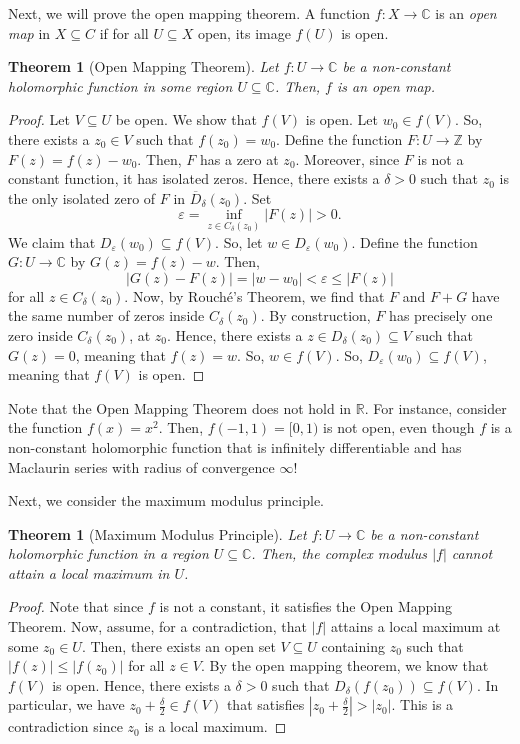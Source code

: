 \documentclass[a4paper, openany]{memoir}
\theoremstyle{definition}
\theoremstyle{plain}
\newtheorem{theorem}[definition]{Theorem}
\begin{document}
    Next, we will prove the open mapping theorem. A function $f \colon X \to \mathbb{C}$ is an \emph{open map} in $X \subseteq C$ if for all $U \subseteq X$ open, its image $f(U)$ is open.
    \begin{theorem}[Open Mapping Theorem]
        Let $f \colon U \to \mathbb{C}$ be a non-constant holomorphic function in some region $U \subseteq \mathbb{C}$. Then, $f$ is an open map.
    \end{theorem}
    \begin{proof}
        Let $V \subseteq U$ be open. We show that $f(V)$ is open. Let $w_0 \in f(V)$. So, there exists a $z_0 \in V$ such that $f(z_0) = w_0$. Define the function $F \colon U \to \mathbb{Z}$ by $F(z) = f(z) - w_0$. Then, $F$ has a zero at $z_0$. Moreover, since $F$ is not a constant function, it has isolated zeros. Hence, there exists a $\delta > 0$ such that $z_0$ is the only isolated zero of $F$ in $\overline{D}_\delta(z_0)$. Set
        \[\varepsilon = \inf_{z \in C_\delta(z_0)} |F(z)| > 0.\]
        We claim that $D_{\varepsilon}(w_0) \subseteq f(V)$. So, let $w \in D_{\varepsilon}(w_0)$. Define the function $G \colon U \to \mathbb{C}$ by $G(z) = f(z) - w$. Then,
        \[|G(z) - F(z)| = |w - w_0| < \varepsilon \leq |F(z)|\]
        for all $z \in C_\delta(z_0)$. Now, by Rouché's Theorem, we find that $F$ and $F + G$ have the same number of zeros inside $C_\delta(z_0)$. By construction, $F$ has precisely one zero inside $C_\delta(z_0)$, at $z_0$. Hence, there exists a $z \in D_\delta(z_0) \subseteq V$ such that $G(z) = 0$, meaning that $f(z) = w$. So, $w \in f(V)$. So, $D_{\varepsilon}(w_0) \subseteq f(V)$, meaning that $f(V)$ is open.
    \end{proof}
    \noindent Note that the Open Mapping Theorem does not hold in $\mathbb{R}$. For instance, consider the function $f(x) = x^2$. Then, $f(-1, 1) = [0, 1)$ is not open, even though $f$ is a non-constant holomorphic function that is infinitely differentiable and has Maclaurin series with radius of convergence $\infty$!

    Next, we consider the maximum modulus principle.
    \begin{theorem}[Maximum Modulus Principle]
        Let $f \colon U \to \mathbb{C}$ be a non-constant holomorphic function in a region $U \subseteq \mathbb{C}$. Then, the complex modulus $|f|$ cannot attain a local maximum in $U$.
    \end{theorem}
    \begin{proof}
        Note that since $f$ is not a constant, it satisfies the Open Mapping Theorem. Now, assume, for a contradiction, that $|f|$ attains a local maximum at some $z_0 \in U$. Then, there exists an open set $V \subseteq U$ containing $z_0$ such that $|f(z)| \leq |f(z_0)|$ for all $z \in V$. By the open mapping theorem, we know that $f(V)$ is open. Hence, there exists a $\delta > 0$ such that $D_\delta(f(z_0)) \subseteq f(V)$. In particular, we have $z_0 + \frac{\delta}{2} \in f(V)$ that satisfies $|z_0 + \tfrac{\delta}{2}| > |z_0|$. This is a contradiction since $z_0$ is a local maximum.
    \end{proof}
    \newpage
\end{document}
